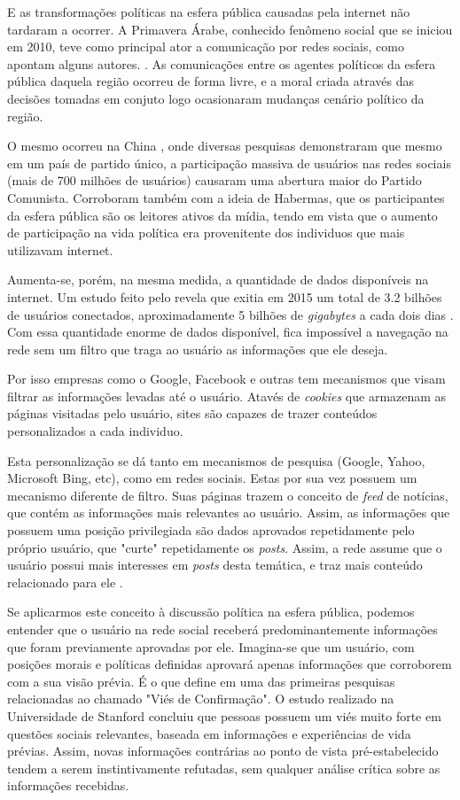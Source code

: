 \documentclass[
	12pt,				%
	oneside,			%
	a4paper,			%
	english,			%
	brazil				%
	]{abntex2ppgsi}
\begin{document}
E as transformações políticas na esfera pública causadas pela internet não tardaram a ocorrer. A Primavera Árabe, conhecido fenômeno social que se iniciou em 2010, teve como principal ator a comunicação por redes sociais, como apontam alguns autores. \cite{vivian,ferabolli}. As comunicações entre os agentes políticos da esfera pública daquela região ocorreu de forma livre, e a moral criada através das decisões tomadas em conjuto logo ocasionaram mudanças cenário político da região. 

O mesmo ocorreu na China \cite{liu}, onde diversas pesquisas demonstraram que mesmo em um país de partido único, a participação massiva de usuários nas redes sociais (mais de 700 milhões de usuários) causaram uma abertura maior do Partido Comunista. Corroboram também com a ideia de Habermas, que os participantes da esfera pública são os leitores ativos da mídia, tendo em vista que o aumento de participação na vida política era provenitente dos individuos que mais utilizavam internet.

Aumenta-se, porém, na mesma medida, a quantidade de dados disponíveis na internet. Um estudo feito pelo  revela que exitia em 2015 um total de 3.2 bilhões de usuários conectados, aproximadamente 5 bilhões de \textit{gigabytes} a cada dois dias \cite{parisier_data}. Com essa quantidade enorme de dados disponível, fica impossível a navegação na rede sem um filtro que traga ao usuário as informações que ele deseja. 

Por isso empresas como o Google, Facebook e outras tem mecanismos que visam filtrar as informações levadas até o usuário. Atavés de \textit{cookies} que armazenam as páginas visitadas pelo usuário, sites são capazes de trazer conteúdos personalizados a cada individuo. 

Esta personalização se dá tanto em mecanismos de pesquisa (Google, Yahoo, Microsoft Bing, etc), como em redes sociais. Estas por sua vez possuem um mecanismo diferente de filtro. Suas páginas trazem o conceito de \textit{feed} de notícias, que contém as informações mais relevantes ao usuário. Assim, as informações que possuem uma posição privilegiada são dados aprovados repetidamente pelo próprio usuário, que "curte" repetidamente os \textit{posts}. Assim, a rede assume que o usuário possui mais interesses em \textit{posts} desta temática, e traz mais conteúdo relacionado para ele \cite{luckerson,parisier}.

Se aplicarmos este conceito à discussão política na esfera pública, podemos entender que o usuário na rede social receberá predominantemente informações que foram previamente aprovadas por ele. Imagina-se que um usuário, com posições morais e políticas definidas aprovará apenas informações que corroborem com a sua visão prévia. É o que define  em uma das primeiras pesquisas relacionadas ao chamado "Viés de Confirmação". O estudo realizado na Universidade de Stanford concluiu que pessoas possuem um viés muito forte em questões sociais relevantes, baseada em informações e experiências de vida prévias. Assim, novas informações contrárias ao ponto de vista pré-estabelecido tendem a serem instintivamente refutadas, sem qualquer análise crítica sobre as informações recebidas. 
\end{document}
